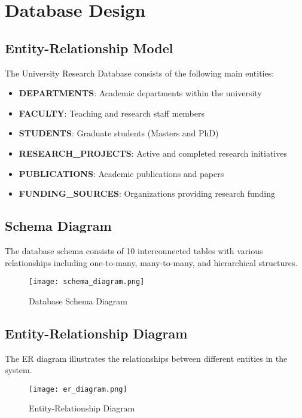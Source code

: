 \documentclass[12pt,a4paper]{article}
\begin{document}
\section{Database Design}

\subsection{Entity-Relationship Model}
The University Research Database consists of the following main entities:
\begin{itemize}
    \item \textbf{DEPARTMENTS}: Academic departments within the university
    \item \textbf{FACULTY}: Teaching and research staff members
    \item \textbf{STUDENTS}: Graduate students (Masters and PhD)
    \item \textbf{RESEARCH\_PROJECTS}: Active and completed research initiatives
    \item \textbf{PUBLICATIONS}: Academic publications and papers
    \item \textbf{FUNDING\_SOURCES}: Organizations providing research funding
\end{itemize}

\subsection{Schema Diagram}
The database schema consists of 10 interconnected tables with various relationships including one-to-many, many-to-many, and hierarchical structures.

\begin{figure}[H]
    \centering
    \texttt{[image: schema\_diagram.png]}
    \caption{Database Schema Diagram}
    \label{fig:schema}
\end{figure}

\subsection{Entity-Relationship Diagram}
The ER diagram illustrates the relationships between different entities in the system.

\begin{figure}[H]
    \centering
    \texttt{[image: er\_diagram.png]}
    \caption{Entity-Relationship Diagram}
    \label{fig:er}
\end{figure}
\end{document}
